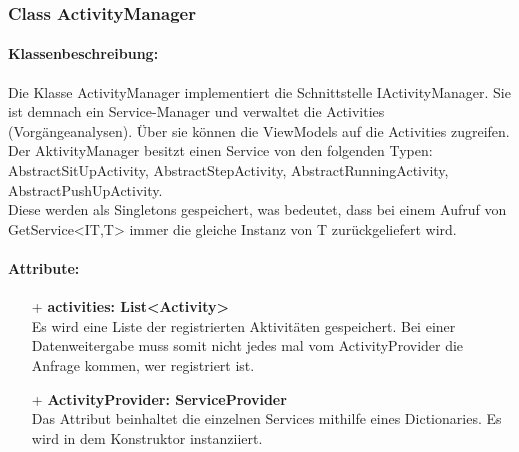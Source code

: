 \documentclass[a4paper,12pt]{article}
\begin{document}
	\subsubsection{Class ActivityManager}
	\paragraph{Klassenbeschreibung:}
	Die Klasse ActivityManager implementiert die Schnittstelle IActivityManager. Sie ist demnach ein Service-Manager und verwaltet die Activities (Vorgängeanalysen). Über sie können die ViewModels auf die Activities zugreifen.\\
	Der AktivityManager besitzt einen Service von den folgenden Typen: AbstractSitUpActivity, AbstractStepActivity, AbstractRunningActivity, AbstractPushUpActivity.\\
	Diese werden als Singletons gespeichert, was bedeutet, dass bei einem Aufruf von GetService<IT,T> immer die gleiche Instanz von T zurückgeliefert wird.
	
	\paragraph{Attribute:}
	\begin{itemize}
		\item[+] \textbf{activities: List<Activity>}\\Es wird eine Liste der registrierten Aktivitäten gespeichert. Bei einer Datenweitergabe muss somit nicht jedes mal vom ActivityProvider die Anfrage kommen, wer registriert ist. 
		\item[+] \textbf{ActivityProvider: ServiceProvider}\\Das Attribut beinhaltet die einzelnen Services mithilfe eines Dictionaries. Es wird in dem Konstruktor instanziiert.
	\end{itemize}
\end{document}
